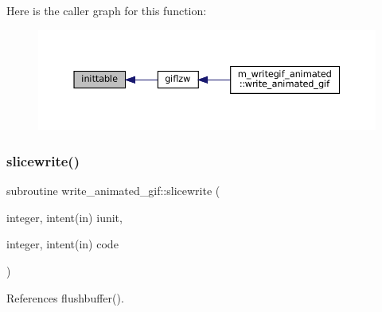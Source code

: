 Here is the caller graph for this function\+:
\nopagebreak
\begin{figure}[H]
\begin{center}
\leavevmode
\includegraphics[width=350pt]{M__writegif__animated_8f90_acd7274fbac8690a12be91b542378a4eb_icgraph}
\end{center}
\end{figure}
\mbox{\label{M__writegif__animated_8f90_ac5c0245eea61f109cbf3ce5bbf38981b}} 
\subsubsection{\texorpdfstring{slicewrite()}{slicewrite()}}
{\footnotesize\ttfamily subroutine write\+\_\+animated\+\_\+gif\+::slicewrite (\begin{DoxyParamCaption}\item[{integer, intent(in)}]{iunit,  }\item[{integer, intent(in)}]{code }\end{DoxyParamCaption})\hspace{0.3cm}{\ttfamily [private]}}



References flushbuffer().

